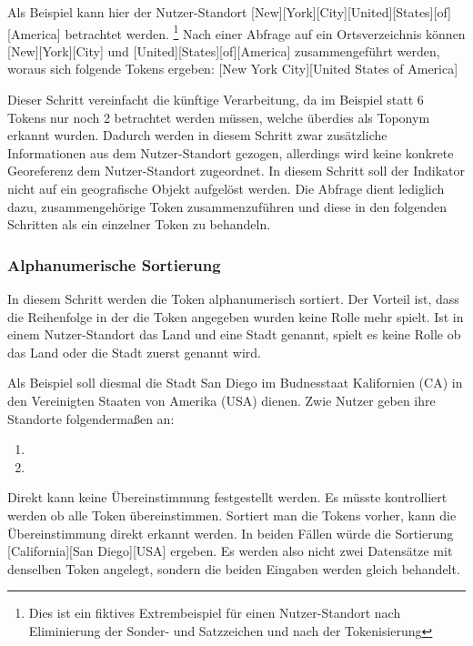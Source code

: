 		  		Als Beispiel kann hier der Nutzer-Standort [New][York][City][United][States][of][America] betrachtet werden. \footnote{Dies ist ein fiktives Extrembeispiel für einen Nutzer-Standort nach Eliminierung der Sonder- und Satzzeichen und nach der Tokenisierung}
		  		Nach einer Abfrage auf ein Ortsverzeichnis können [New][York][City] und [United][States][of][America] zusammengeführt werden, woraus sich folgende Tokens ergeben:
		  		[New York City][United States of America]   

		  		Dieser Schritt vereinfacht die künftige Verarbeitung, da im Beispiel statt 6 Tokens nur noch 2 betrachtet werden müssen, welche überdies als Toponym erkannt wurden.
		  		Dadurch werden in diesem Schritt zwar zusätzliche Informationen aus dem Nutzer-Standort gezogen, allerdings wird keine konkrete Georeferenz dem Nutzer-Standort zugeordnet.
		  		In diesem Schritt soll der Indikator nicht auf ein geografische Objekt aufgelöst werden. 
		  		Die Abfrage dient lediglich dazu, zusammengehörige Token zusammenzuführen und diese in den folgenden Schritten als ein einzelner Token zu behandeln. 




		  	\subsubsection{Alphanumerische Sortierung}

		  		In diesem Schritt werden die Token alphanumerisch sortiert. 
		  		Der Vorteil ist, dass die Reihenfolge in der die Token angegeben wurden keine Rolle mehr spielt. 
		  		Ist in einem Nutzer-Standort das Land und eine Stadt genannt, spielt es keine Rolle ob das Land oder die Stadt zuerst genannt wird. 

		  		Als Beispiel soll diesmal die Stadt San Diego im Budnesstaat Kalifornien (CA) in den Vereinigten Staaten von Amerika (USA) dienen. 
		  		Zwie Nutzer geben ihre Standorte folgendermaßen an:

		  		\begin{enumerate}
		  			\item[Nutzer 1]  	[San Diego][California][USA]
		  			\item[Nutzer 2] 	[USA][California][San Diego] 
		  		\end{enumerate}

		  		Direkt kann keine Übereinstimmung festgestellt werden. 
		  		Es müsste kontrolliert werden ob alle Token übereinstimmen.
		  		Sortiert man die Tokens vorher, kann die Übereinstimmung direkt erkannt werden.
		  		In beiden Fällen würde die Sortierung [California][San Diego][USA] ergeben.
		  		Es werden also nicht zwei Datensätze mit denselben Token angelegt, sondern die beiden Eingaben werden gleich behandelt.




